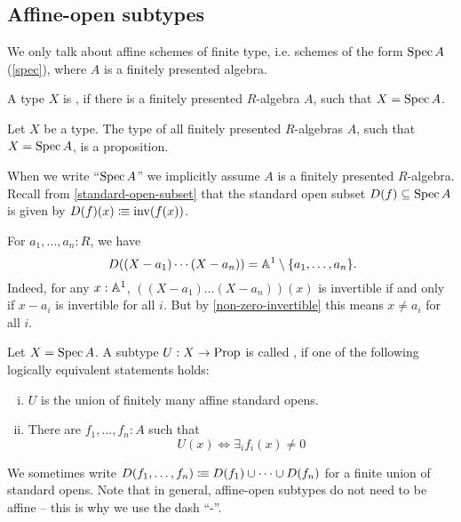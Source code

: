 \subsection{Affine-open subtypes}

We only talk about affine schemes of finite type, i.e. schemes of the form $\operatorname{Spec} A$ (\cref{spec}),
where $A$ is a finitely presented algebra.

\begin{definition}%
  A type $X$ is ,
  if there is a finitely presented $R$-algebra $A$, such that $X=\operatorname{Spec} A$.
\end{definition}

\begin{proposition}%
  Let $X$ be a type.
  The type of all finitely presented $R$-algebras $A$, such that $X=\operatorname{Spec} A$, is a proposition.
\end{proposition}

When we write ``$\operatorname{Spec} A$'' we implicitly assume $A$ is a finitely presented $R$-algebra.
Recall from \cref{standard-open-subset}
that the standard open subset $D(f) \subseteq \operatorname{Spec} A$
is given by $D(f)(x)\vcentcolon\mspace{-1.2mu}\equiv \mathrm{inv}(f(x))$.

\begin{example}
  For $a_1, \dots, a_n : R$, we have
  \[ D((X - a_1) \cdots (X - a_n)) = \A^1 \setminus \{ a_1, \dots, a_n \} \rlap{.}\]
  Indeed,
  for any $x : \mathbb{A}^1$,
  $((X - a_1) \dots (X - a_n))(x)$ is invertible if and only if
  $x - a_i$ is invertible for all $i$.
  But by \cref{non-zero-invertible}
  this means $x \neq a_i$ for all $i$.
\end{example}

\begin{definition}%
  \label{affine-open}
  Let $X=\operatorname{Spec} A$.
  A subtype $U:X\to\mathrm{Prop}$ is called ,
  if one of the following logically equivalent statements holds:
  \begin{enumerate}[(i)]%
  \item $U$ is the union of finitely many affine standard opens.
  \item There are $f_1,\dots,f_n:A$ such that
    \[U(x) \Leftrightarrow \exists_{i} f_i(x)\neq 0 \]
  \end{enumerate}
\end{definition}

We sometimes write $D(f_1, \dots, f_n) \vcentcolon\mspace{-1.2mu}\equiv D(f_1) \cup \dots \cup D(f_n)$
for a finite union of standard opens.
Note that in general, affine-open subtypes do not need to be affine
-- this is why we use the dash ``-''.

